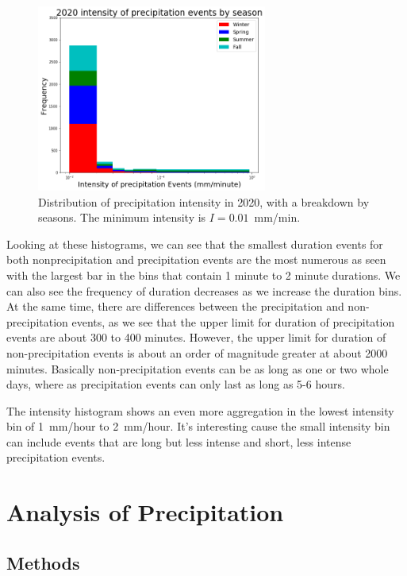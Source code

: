 \documentclass[11pt]{report}
\begin{document}
\begin{figure}[b]
	\centering
	\includegraphics[width=0.675\textwidth]{Figures/inten2020.png}
	\caption[Intensity histogram for 2020 broken down by season]
	{\label{i2020} Distribution of precipitation intensity in
		2020, with a breakdown by seasons. The minimum intensity is
		$I=0.01$~mm/min. }
\end{figure}
\clearpage


Looking at these histograms, we can see that the smallest duration events for both nonprecipitation and precipitation events are the most numerous as seen with the largest bar in the bins that contain 1 minute to 2 minute durations. We can also see the frequency of duration decreases as we increase the duration bins. At the same time, there are differences between the precipitation and non-precipitation events, as we see that the upper limit for duration of precipitation events are about 300 to 400 minutes. However, the upper limit for duration of non-precipitation events is about an order of magnitude greater at about 2000 minutes. Basically non-precipitation events can be as long as one or two whole days, where as precipitation events can only last as long as 5-6 hours. 

The intensity histogram shows an even more aggregation in the lowest intensity bin of 1~mm/hour to 2~mm/hour. It's interesting cause the small intensity bin can include events that are long but less intense and short, less intense precipitation events.  
\section{Analysis of Precipitation}\label{sec:apc}


\subsection{Methods}\label{sec:methods}
\end{document}
